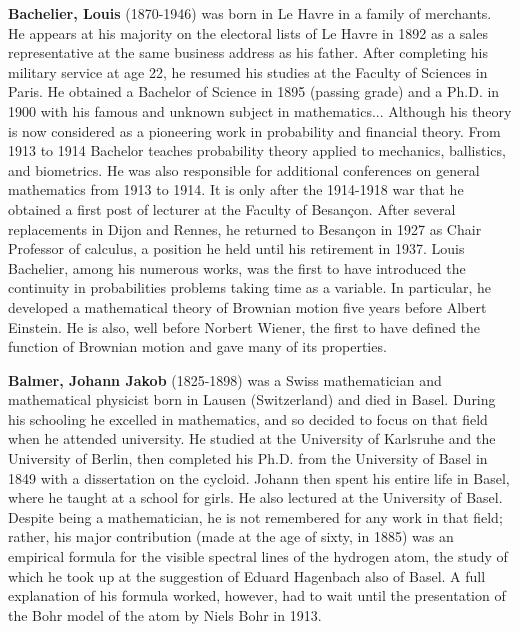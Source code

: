 \pichskip{15pt}%
\textbf{Bachelier, Louis} (1870-1946) was born in Le Havre in a family of merchants. He appears at his majority on the electoral lists of Le Havre in 1892 as a sales representative at the same business address as his father. After completing his military service at age 22, he resumed his studies at the Faculty of Sciences in Paris. He obtained a Bachelor of Science in 1895 (passing grade) and a Ph.D. in 1900 with his famous and unknown subject in mathematics... Although his theory is now considered as a pioneering work in probability and financial theory. From 1913 to 1914 Bachelor teaches probability theory applied to mechanics, ballistics, and biometrics. He was also responsible for additional conferences on general mathematics from 1913 to 1914. It is only after the 1914-1918 war that he obtained a first post of lecturer at the Faculty of Besançon. After several replacements in Dijon and Rennes, he returned to Besançon in 1927 as Chair Professor of calculus, a position he held until his retirement in 1937. Louis Bachelier, among his numerous works, was the first to have introduced the continuity in probabilities problems taking time as a variable. In particular, he developed a mathematical theory of Brownian motion five years before Albert Einstein. He is also, well before Norbert Wiener, the first to have defined the function of Brownian motion and gave many of its properties.

\textbf{Balmer, Johann Jakob} (1825-1898) was a Swiss mathematician and mathematical physicist born in Lausen (Switzerland) and died in Basel. During his schooling he excelled in mathematics, and so decided to focus on that field when he attended university. He studied at the University of Karlsruhe and the University of Berlin, then completed his Ph.D. from the University of Basel in 1849 with a dissertation on the cycloid. Johann then spent his entire life in Basel, where he taught at a school for girls. He also lectured at the University of Basel. Despite being a mathematician, he is not remembered for any work in that field; rather, his major contribution (made at the age of sixty, in 1885) was an empirical formula for the visible spectral lines of the hydrogen atom, the study of which he took up at the suggestion of Eduard Hagenbach also of Basel. A full explanation of his formula worked, however, had to wait until the presentation of the Bohr model of the atom by Niels Bohr in 1913.

